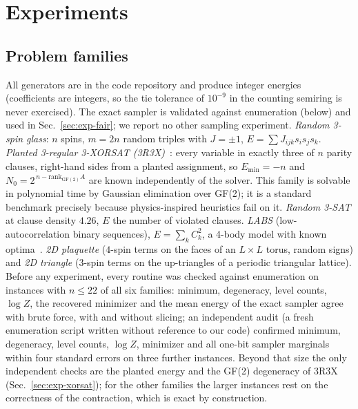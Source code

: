 \documentclass{article}
\newcommand{\Emin}{E_{\min}}
\newcommand{\N}{N_0}
\begin{document}
\section{Experiments}
\label{sec:experiments}

\subsection{Problem families}
All generators are in the code repository and produce integer energies (coefficients are integers, so the tie tolerance of $10^{-9}$ in the counting semiring is never exercised). The exact sampler is validated against enumeration (below) and used in Sec.~\ref{sec:exp-fair}; we report no other sampling experiment.
\emph{Random 3-spin glass}: $n$ spins, $m=2n$ random triples with $J=\pm1$, $E=\sum J_{ijk}s_is_js_k$.
\emph{Planted 3-regular 3-XORSAT (3R3X)}~\cite{kowalsky2022xorsat}: every variable in exactly three of $n$ parity clauses, right-hand sides from a planted assignment, so $\Emin=-n$ and $\N=2^{\,n-\mathrm{rank}_{\mathrm{GF}(2)}A}$ are known independently of the solver. This family is solvable in polynomial time by Gaussian elimination over GF(2); it is a standard benchmark precisely because physics-inspired heuristics fail on it.
\emph{Random 3-SAT} at clause density $4.26$, $E$ the number of violated clauses.
\emph{LABS} (low-autocorrelation binary sequences), $E=\sum_k C_k^2$, a 4-body model with known optima~\cite{packebusch2016labs}.
\emph{2D plaquette} ($4$-spin terms on the faces of an $L\times L$ torus, random signs) and \emph{2D triangle} ($3$-spin terms on the up-triangles of a periodic triangular lattice).
Before any experiment, every routine was checked against enumeration on instances with $n\le 22$ of all six families: minimum, degeneracy, level counts, $\log Z$, the recovered minimizer and the mean energy of the exact sampler agree with brute force, with and without slicing; an independent audit (a fresh enumeration script written without reference to our code) confirmed minimum, degeneracy, level counts, $\log Z$, minimizer and all one-bit sampler marginals within four standard errors on three further instances. Beyond that size the only independent checks are the planted energy and the GF(2) degeneracy of 3R3X (Sec.~\ref{sec:exp-xorsat}); for the other families the larger instances rest on the correctness of the contraction, which is exact by construction.
\end{document}
